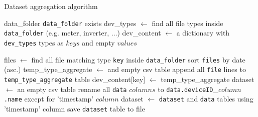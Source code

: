 \begin{algorithm}[H]
	\caption{Dataset aggregation algorithm}\label{alg:dataset}
	\begin{algorithmic}
		\Require data\_folder
		\Ensure \texttt{data\_folder} exists
		\State dev\_types $\gets$ find all file types inside \texttt{data\_folder} (e.g. meter, inverter, $\ldots$)
		\State dev\_content $\gets$ a dictionary with \texttt{dev\_types} types as $keys$ and empty $values$

		\State files $\gets$ find all file matching type \texttt{key} inside \texttt{data\_folder}
		\State sort \texttt{files} by date (asc.)
		\State temp\_type\_aggregate $\gets$ and empty csv table
		\State append all \texttt{file} lines to \texttt{temp\_type\_aggregate} table
		\EndFor
		\State dev\_content[key] $\gets$ temp\_type\_aggregate
		\EndFor
		\State{}
		\State
		\State dataset $\gets$ an empty csv table
		 
		\State rename all \texttt{data} $columns$ to \texttt{data.deviceID}\_\texttt{$column$.name}
		\State except for 'timestamp' $column$
		\State dataset $\gets$ \texttt{dataset} and \texttt{data} tables using 'timestamp' column
		\EndFor
		\State save \texttt{dataset} table to file
	\end{algorithmic}
\end{algorithm}

